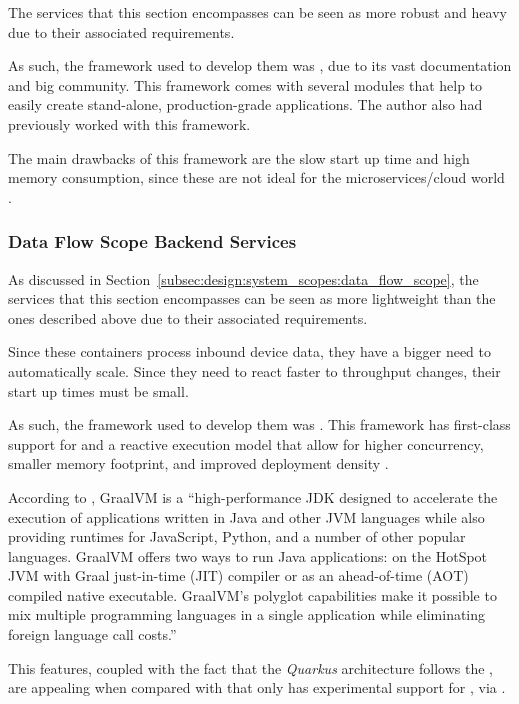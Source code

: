 The services that this section encompasses can be seen as more robust and heavy due to their associated requirements.

As such, the framework used to develop them was , due to its vast documentation and big community. This framework comes with several modules that help to easily create stand-alone, production-grade applications. The author also had previously worked with this framework.

The main drawbacks of this framework are the slow start up time and high memory consumption, since these are not ideal for the microservices/cloud world \parencite{springslow}.

\subsubsection{Data Flow Scope Backend Services}
\label{subsubsec:implementation:decisions:backend:flow}

As discussed in Section~\ref{subsec:design:system_scopes:data_flow_scope}, the services that this section encompasses can be seen as more lightweight than the ones described above due to their associated requirements.

Since these containers process inbound device data, they have a bigger need to automatically scale. Since they need to react faster to throughput changes, their start up times must be small.

As such, the framework used to develop them was . This framework has first-class support for  and a reactive execution model that allow for higher concurrency, smaller memory footprint, and improved deployment density \parencite{quarkus-reactive} .

According to \cite{graalvm-intro}, GraalVM is a ``high-performance JDK designed to accelerate the execution of applications written in Java and other JVM languages while also providing runtimes for JavaScript, Python, and a number of other popular languages. GraalVM offers two ways to run Java applications: on the HotSpot JVM with Graal just-in-time (JIT) compiler or as an ahead-of-time (AOT) compiled native executable. GraalVM's polyglot capabilities make it possible to mix multiple programming languages in a single application while eliminating foreign language call costs.''

This features, coupled with the fact that the \textit{Quarkus} architecture follows the , are appealing when compared with  that only has experimental support for , via .

